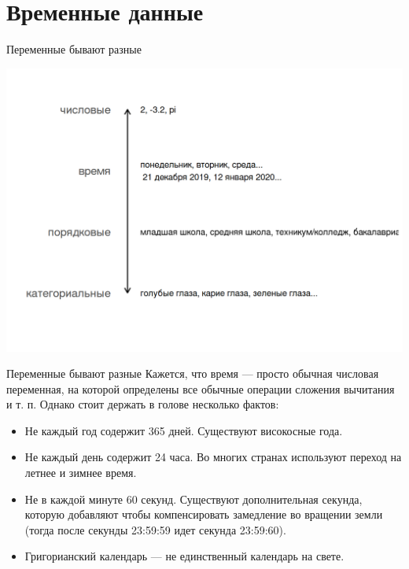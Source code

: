 \documentclass[
  ignorenonframetext,
  t]{beamer}
\providecommand{\tightlist}{%
  \setlength{\itemsep}{0pt}\setlength{\parskip}{0pt}}\usepackage{longtable,booktabs,array}
\begin{document}
\section{Временные
данные}\label{ux432ux440ux435ux43cux435ux43dux43dux44bux435-ux434ux430ux43dux43dux44bux435}

\begin{frame}{Переменные бывают разные}
\label{ux43fux435ux440ux435ux43cux435ux43dux43dux44bux435-ux431ux44bux432ux430ux44eux442-ux440ux430ux437ux43dux44bux435}
\begin{center}
\includegraphics[width=1.08\linewidth,height=\textheight,keepaspectratio]{images/09_time_variable.png}
\end{center}
\end{frame}

\begin{frame}{Переменные бывают разные}
\label{ux43fux435ux440ux435ux43cux435ux43dux43dux44bux435-ux431ux44bux432ux430ux44eux442-ux440ux430ux437ux43dux44bux435-1}
Кажется, что время --- просто обычная числовая переменная, на которой
определены все обычные операции сложения вычитания и т. п. Однако стоит
держать в голове несколько фактов:

\begin{itemize}
\tightlist
\item
  Не каждый год содержит 365 дней. Существуют високосные года. \pause
\item
  Не каждый день содержит 24 часа. Во многих странах используют переход
  на летнее и зимнее время. \pause
\item
  Не в каждой минуте 60 секунд. Существуют дополнительная секунда,
  которую добавляют чтобы компенсировать замедление во вращении земли
  (тогда после секунды 23:59:59 идет секунда 23:59:60). \pause
\item
  Григорианский календарь --- не единственный календарь на свете.
\end{itemize}
\end{frame}
\end{document}
